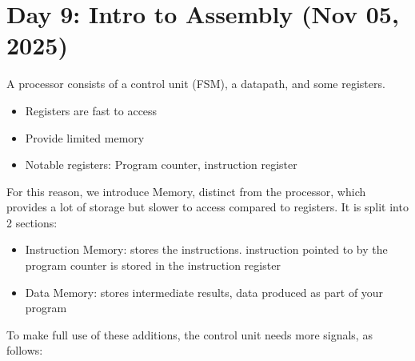 \section{Day 9: Intro to Assembly (Nov 05, 2025)}

A processor consists of a control unit (FSM), a datapath, and some registers.
\begin{itemize}
\item Registers are fast to access
\item Provide limited memory
\item Notable registers: Program counter, instruction register
\end{itemize}
For this reason, we introduce Memory, distinct from the processor, which provides a lot of storage but slower to access compared to registers. It is split into 2 sections:
\begin{itemize}
    \item Instruction Memory: stores the instructions. instruction pointed to by the program counter is stored in the instruction register
    \item Data Memory: stores intermediate results, data produced as part of your program
\end{itemize}

\noindent To make full use of these additions, the control unit needs more signals, as follows:

